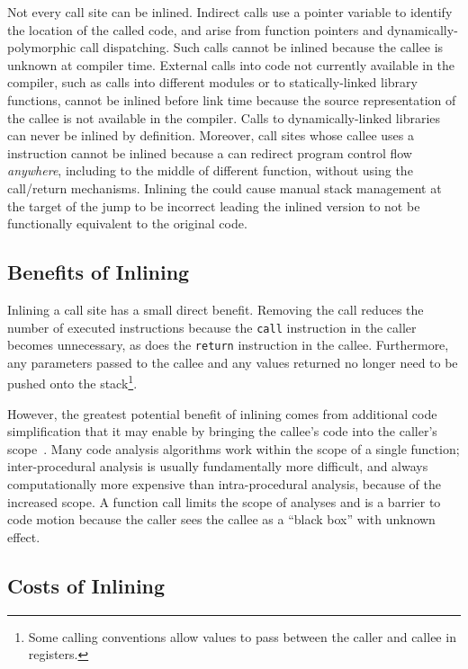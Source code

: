 Not every call site can be inlined.  Indirect calls use a pointer variable to identify the location of the called code, and arise from function pointers and dynamically-polymorphic call dispatching.  Such calls cannot be inlined because the callee is unknown at compiler time.  External calls into code not currently available in the compiler, such as calls into different modules or to statically-linked library functions, cannot be inlined before link time because the source representation of the callee is not available in the compiler. Calls to dynamically-linked libraries can never be inlined by definition. Moreover, call sites whose callee uses a  instruction cannot be inlined because a  can redirect program control flow {\it anywhere}, including to the middle of different function, without using the call/return mechanisms.  Inlining the  could cause manual stack management at the target of the jump to be incorrect leading the inlined version to not be functionally equivalent to the original code.

\subsection{Benefits of Inlining}

Inlining a call site has a small direct benefit.  Removing the call reduces the number of executed instructions because the {\tt call} instruction in the caller becomes unnecessary, as does the {\tt return} instruction in the callee.  Furthermore, any parameters passed to the callee and any values returned no longer need to be pushed onto the stack\footnote{Some calling conventions allow values to pass between  the caller and callee in registers.}.

However, the greatest potential benefit of inlining comes from additional code simplification that it may enable by bringing the callee's code into the caller's scope~\cite{BerubePhD}. Many code analysis algorithms work within the scope of a single function; inter-procedural analysis is usually fundamentally more difficult, and always computationally more expensive than intra-procedural analysis, because of the increased scope.  A function call limits the scope of analyses and is a barrier to code motion because the caller sees the callee as a ``black box'' with unknown effect.

\subsection{Costs of Inlining}

